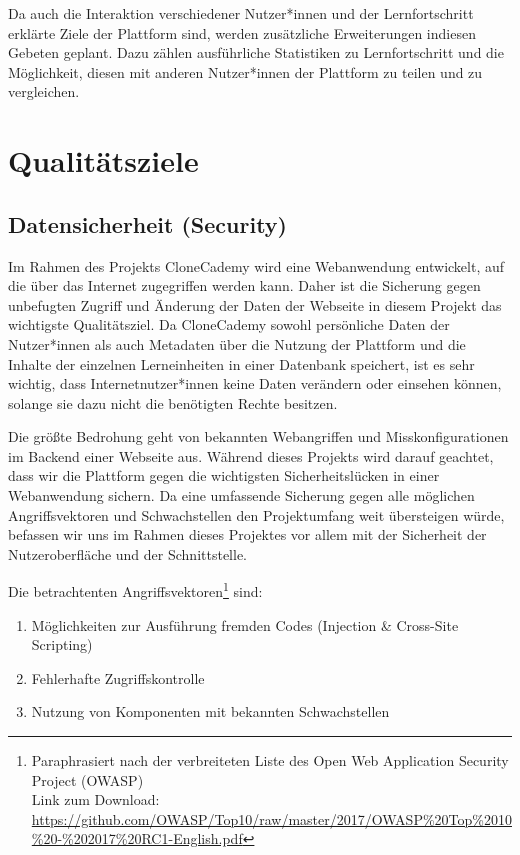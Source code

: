 \documentclass[accentcolor=tud0b,12pt,paper=a4]{tudreport}
\begin{document}
Da auch die Interaktion verschiedener Nutzer*innen und der Lernfortschritt erklärte Ziele der Plattform sind, werden zusätzliche Erweiterungen indiesen Gebeten geplant. Dazu zählen ausführliche Statistiken zu Lernfortschritt und die Möglichkeit, diesen mit anderen Nutzer*innen der Plattform zu teilen und zu vergleichen.

\chapter{Qualitätsziele}
\section{Datensicherheit (Security)}

Im Rahmen des Projekts CloneCademy wird eine Webanwendung entwickelt, auf die über das Internet zugegriffen werden kann. Daher ist die Sicherung gegen unbefugten Zugriff und Änderung der Daten der Webseite in diesem Projekt das wichtigste Qualitätsziel. Da CloneCademy sowohl persönliche Daten der Nutzer*innen als auch Metadaten über die Nutzung der Plattform und die Inhalte der einzelnen Lerneinheiten in einer Datenbank speichert, ist es sehr wichtig, dass Internetnutzer*innen keine Daten verändern oder einsehen können, solange sie dazu nicht die benötigten Rechte besitzen.

Die größte Bedrohung geht von bekannten Webangriffen und Misskonfigurationen im Backend einer Webseite aus. Während dieses Projekts wird darauf geachtet, dass wir die Plattform gegen die wichtigsten Sicherheitslücken in einer Webanwendung sichern. Da eine umfassende Sicherung gegen alle möglichen Angriffsvektoren und Schwachstellen den Projektumfang weit übersteigen würde, befassen wir uns im Rahmen dieses Projektes vor allem mit der Sicherheit der Nutzeroberfläche und der Schnittstelle.

Die betrachtenten Angriffsvektoren\footnote{Paraphrasiert nach der verbreiteten Liste des Open Web Application Security Project (OWASP)\\Link zum Download:  \href{https://github.com/OWASP/Top10/raw/master/2017/OWASP\%20Top\%2010\%20-\%202017\%20RC1-English.pdf}{https://github.com/OWASP/Top10/raw/master/2017/OWASP\%20Top\%2010\%20-\%202017\%20RC1-English.pdf}} sind:
\begin{enumerate}
\item Möglichkeiten zur Ausführung fremden Codes (Injection \& Cross-Site Scripting)
\item Fehlerhafte Zugriffskontrolle
\item Nutzung von Komponenten mit bekannten Schwachstellen
\end{enumerate}
\end{document}
